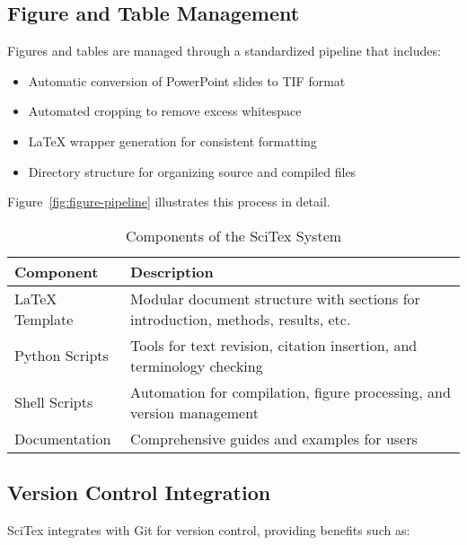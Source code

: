 \documentclass[preprint,review,12pt]{elsarticle}%
\begin{document}
\begin{frontmatter}

\subsection{Figure and Table Management}
\label{subsec:figure-management}

Figures and tables are managed through a standardized pipeline that includes:

\begin{itemize}
    \item Automatic conversion of PowerPoint slides to TIF format
    \item Automated cropping to remove excess whitespace
    \item LaTeX wrapper generation for consistent formatting
    \item Directory structure for organizing source and compiled files
\end{itemize}

Figure~\ref{fig:figure-pipeline} illustrates this process in detail.


\begin{table}[h!]
\centering
\caption{Components of the SciTex System}
\label{tab:components}
\begin{tabular}{lp{8cm}}
\hline
\textbf{Component} & \textbf{Description} \\
\hline
LaTeX Template & Modular document structure with sections for introduction, methods, results, etc. \\
Python Scripts & Tools for text revision, citation insertion, and terminology checking \\
Shell Scripts & Automation for compilation, figure processing, and version management \\
Documentation & Comprehensive guides and examples for users \\
\hline
\end{tabular}
\end{table}

\subsection{Version Control Integration}
\label{subsec:version-control}

SciTex integrates with Git for version control, providing benefits such as:


\end{frontmatter}
\end{document}
